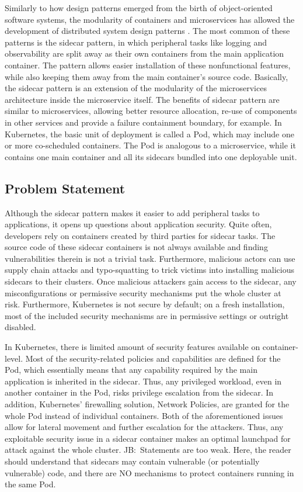 \documentclass[english, 12pt, a4paper, sci, utf8, a-2b, online]{aaltothesis}
\newcommand{\mycomment}[3]{\textcolor{#1}{#2:~#3}}
\newcommand{\jb}[1]{\noindent\mycomment{aaltoRed}{JB}{#1}}
\begin{document}
Similarly to how design patterns emerged from the birth of object-oriented software systems, the modularity of containers and microservices has allowed the development of distributed system design patterns \cite{burns2016design}.
The most common of these patterns is the sidecar pattern, in which peripheral tasks like logging and observability are split away as their own containers from the main application container.
The pattern allows easier installation of these nonfunctional features, while also keeping them away from the main container's source code.
Basically, the sidecar pattern is an extension of the modularity of the microservices architecture inside the microservice itself.
The benefits of sidecar pattern are similar to microservices, allowing better resource allocation, re-use of components in other services and provide a failure containment boundary, for example.
In Kubernetes, the basic unit of deployment is called a Pod, which may include one or more co-scheduled containers.
The Pod is analogous to a microservice, while it contains one main container and all its sidecars bundled into one deployable unit.

\subsection{Problem Statement}

Although the sidecar pattern makes it easier to add peripheral tasks to applications, it opens up questions about application security.
Quite often, developers rely on containers created by third parties for sidecar tasks.
The source code of these sidecar containers is not always available and finding vulnerabilities therein is not a trivial task.
Furthermore, malicious actors can use supply chain attacks and typo-squatting to trick victims into installing malicious sidecars to their clusters.
Once malicious attackers gain access to the sidecar, any misconfigurations or permissive security mechanisms put the whole cluster at risk.
Furthermore, Kubernetes is not secure by default; on a fresh installation, most of the included security mechanisms are in permissive settings or outright disabled.

In Kubernetes, there is limited amount of security features available on container-level.
Most of the security-related policies and capabilities are defined for the Pod, which essentially means that any capability required by the main application is inherited in the sidecar.
Thus, any privileged workload, even in another container in the Pod, risks privilege escalation from the sidecar.
In addition, Kubernetes' firewalling solution, Network Policies, are granted for the whole Pod instead of individual containers.
Both of the aforementioned issues allow for lateral movement and further escalation for the attackers.
Thus, any exploitable security issue in a sidecar container makes an optimal launchpad for attack against the whole cluster.
\jb{Statements are too weak. Here, the reader should understand that sidecars may contain vulnerable (or potentially vulnerable) code, and there are NO mechanisms to protect containers running in the same Pod.}
\end{document}
